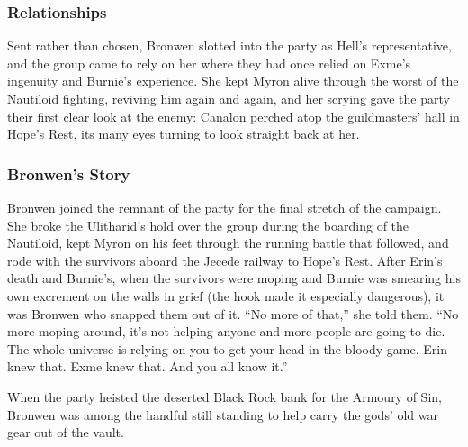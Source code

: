 \subsubsection{Relationships}

Sent rather than chosen, Bronwen slotted into the party as Hell's representative, and the group came to rely on her where they had once relied on Exme's ingenuity and Burnie's experience. She kept Myron alive through the worst of the Nautiloid fighting, reviving him again and again, and her scrying gave the party their first clear look at the enemy: Canalon perched atop the guildmasters' hall in Hope's Rest, its many eyes turning to look straight back at her.

\subsubsection{Bronwen's Story}

Bronwen joined the remnant of the party for the final stretch of the campaign. She broke the Ulitharid's hold over the group during the boarding of the Nautiloid, kept Myron on his feet through the running battle that followed, and rode with the survivors aboard the Jecede railway to Hope's Rest. After Erin's death and Burnie's, when the survivors were moping and Burnie was smearing his own excrement on the walls in grief (the hook made it especially dangerous), it was Bronwen who snapped them out of it.  ``No more of that,'' she told them.  ``No more moping around, it's not helping anyone and more people are going to die.  The whole universe is relying on you to get your head in the bloody game.  Erin knew that.  Exme knew that.  And you all know it.''

When the party heisted the deserted Black Rock bank for the Armoury of Sin, Bronwen was among the handful still standing to help carry the gods' old war gear out of the vault.

\clearpage
